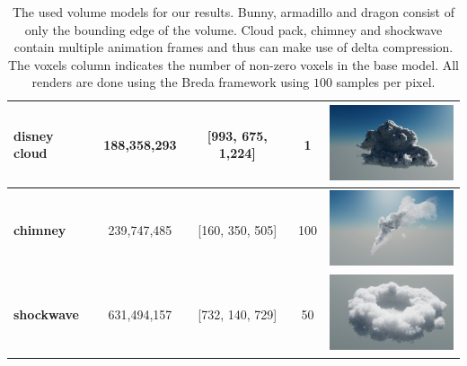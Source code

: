 \begin{table}[htbp]
\begin{tabularx}{\textwidth}{|X|c|c|c|c|}
    \hline
    \raggedright\textbf{disney cloud} & 188,358,293 & [993, 675, 1,224] & 1 & \includegraphics[width=4cm]{figures/disney cloud.png}\\
    \hline
    \textbf{chimney} & 239,747,485 & [160, 350, 505] & 100 & \includegraphics[width=4cm]{figures/chimney.png}\\
    \hline
    \textbf{shockwave} & 631,494,157 & [732, 140, 729] & 50 & \includegraphics[width=4cm]{figures/shockwave.png}\\
    \hline
    \end{tabularx}
    \caption{The used volume models for our results. Bunny, armadillo and dragon consist of only the bounding edge of the volume. Cloud pack, chimney and shockwave contain multiple animation frames and thus can make use of delta compression. The voxels column indicates the number of non-zero voxels in the base model. All renders are done using the Breda framework using $100$ samples per pixel. }
    \label{tab:data-summary}
\end{table}


